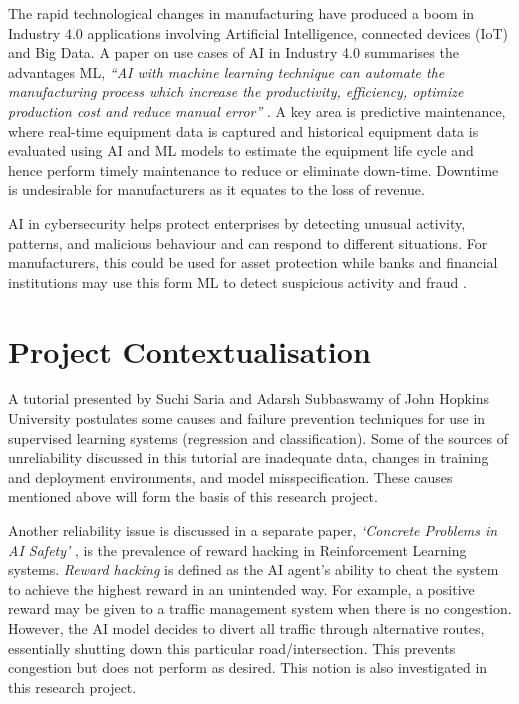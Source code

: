 The rapid technological changes in manufacturing have produced a boom 
in Industry 4.0 applications involving Artificial Intelligence, connected
 devices (IoT) and Big Data. A paper on use cases of AI in Industry 4.0 
 summarises the advantages ML, \textit{“AI with machine learning technique can 
 automate the manufacturing process which increase the productivity, 
 efficiency, optimize production cost and reduce manual error” }\cite{9004327}. A 
 key area is predictive maintenance, where real-time equipment data is 
 captured and historical equipment data is evaluated using AI and ML 
 models to estimate the equipment life cycle and hence perform timely 
 maintenance to reduce or eliminate down-time. Downtime is undesirable
for manufacturers as it equates to the loss of revenue.

AI in cybersecurity helps protect enterprises by detecting unusual 
activity, patterns, and malicious behaviour and can respond to different 
situations. For manufacturers, this could be used for asset protection 
while banks and financial institutions may use this form ML to detect suspicious 
activity and fraud \cite{9004327}. 

\section{Project Contextualisation}
A tutorial presented by Suchi Saria and Adarsh Subbaswamy of John Hopkins University \cite{saria2019tutorial} postulates some causes and failure prevention techniques for use in supervised learning systems (regression and classification). 
Some of the sources of unreliability discussed in this tutorial are inadequate data, changes in training and deployment environments, and model misspecification. 
These causes mentioned above will form the basis of this research project.

\enlargethispage{-\baselineskip}
Another reliability issue is discussed in a separate paper, \textit{‘Concrete Problems in AI Safety’} \cite{Amodei}, is the prevalence of reward hacking in Reinforcement Learning systems. 
\textit{Reward hacking} is defined as the AI agent’s ability to cheat the system to achieve the highest reward in an unintended way. 
For example, a positive reward may be given to a traffic management system when there is no congestion. However, the AI model decides to divert all traffic through alternative routes, essentially shutting down this particular road/intersection. 
This prevents congestion but does not perform as desired. This notion is also investigated in this research project.

